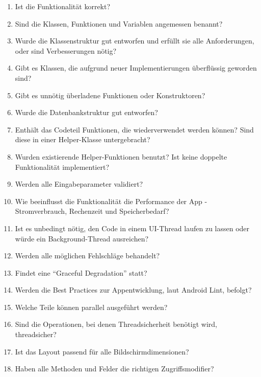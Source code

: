 
\begin{enumerate}[ 1.]
  \item Ist die Funktionalität korrekt?
  \item Sind die Klassen, Funktionen und Variablen angemessen benannt?
  \item Wurde die Klassenstruktur gut entworfen und erfüllt sie alle Anforderungen, oder sind Verbesserungen nötig?
  \item Gibt es Klassen, die aufgrund neuer Implementierungen überflüssig geworden sind?
  \item Gibt es unnötig überladene Funktionen oder Konstruktoren?
  \item Wurde die Datenbankstruktur gut entworfen?
  \item Enthält das Codeteil Funktionen, die wiederverwendet werden können? Sind diese in einer Helper-Klasse untergebracht?
  \item Wurden existierende Helper-Funktionen benutzt? Ist keine doppelte Funktionalität implementiert?
  \item Werden alle Eingabeparameter validiert?
  \item Wie beeinflusst die Funktionalität die Performance der App - Stromverbrauch, Rechenzeit und Speicherbedarf?
  \item Ist es unbedingt nötig, den Code in einem UI-Thread laufen zu lassen oder würde ein Background-Thread ausreichen?
  \item Werden alle möglichen Fehlschläge behandelt?
  \item Findet eine ``Graceful Degradation'' statt?
  \item Werden die Best Practices zur Appentwicklung, laut Android Lint, befolgt?
  \item Welche Teile können parallel ausgeführt werden?
  \item Sind die Operationen, bei denen Threadsicherheit benötigt wird, threadsicher?
  \item Ist das Layout passend für alle Bildschirmdimensionen?
  \item Haben alle Methoden und Felder die richtigen Zugriffsmodifier?
\end{enumerate}
